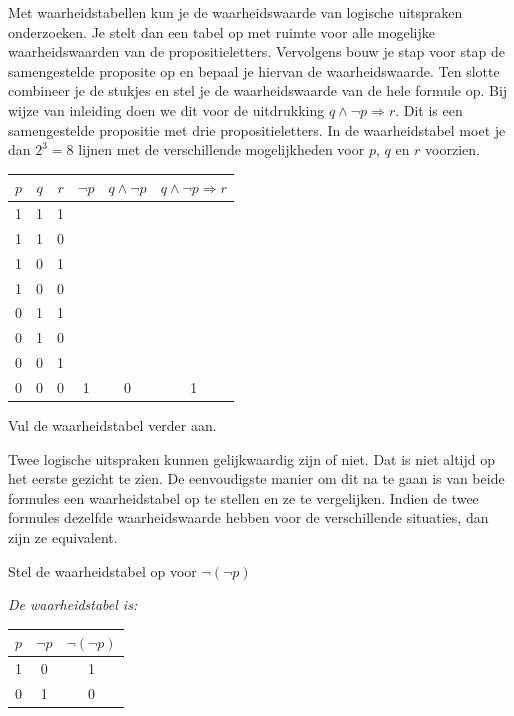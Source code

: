 
Met waarheidstabellen kun je de waarheidswaarde van logische uitspraken onderzoeken. Je stelt dan een tabel op met ruimte voor alle mogelijke waarheidswaarden van de propositieletters. Vervolgens bouw je stap voor stap de samengestelde proposite op en bepaal je hiervan de waarheidswaarde. Ten slotte combineer je de stukjes en stel je de waarheidswaarde van de hele formule op. Bij wijze van inleiding doen we dit voor de uitdrukking $q\land \lnot p \Rightarrow r$. Dit is een samengestelde propositie met drie propositieletters. In de waarheidstabel moet je dan $2^3=8$ lijnen met de verschillende mogelijkheden voor $p$, $q$ en $r$ voorzien.

\begin{center}
\begin{tabular}{c|c|c|c|c|c}  
$p$ & $q$ & $r$ & $\lnot p$ & $q\land \lnot p$ & $q\land \lnot p \Rightarrow r$\\
\hline
1 & 1 & 1 &  &  & \\
1 & 1 & 0 &  &  & \\
1 & 0 & 1 &  &  & \\
1 & 0 & 0 &  &  & \\
0 & 1 & 1 &  &  & \\
0 & 1 & 0 &  &  & \\
0 & 0 & 1 &  &  & \\
0 & 0 & 0 & 1 & 0 & 1
\end{tabular}
\end{center}

\begin{werktekstoef}
\item{Vul de waarheidstabel verder aan.}
\end{werktekstoef}

Twee logische uitspraken kunnen gelijkwaardig zijn of niet. Dat is niet altijd op het eerste gezicht te zien. De eenvoudigste manier om dit na te gaan is van beide formules een waarheidstabel op te stellen en ze te vergelijken. Indien de twee formules dezelfde waarheidswaarde hebben voor de verschillende situaties, dan zijn ze equivalent. 

\begin{werktekstoef}
\setcounter{enumi}{1} 
\item{Stel de waarheidstabel op voor $\lnot (\lnot p)$}

\emph{De waarheidstabel is:}
\end{werktekstoef}
\begin{center}
\begin{tabular}{c|c|c}  
$p$ & $\lnot p$ & $\lnot (\lnot p)$\\
\hline
1 & 0 & 1\\
0 & 1 & 0
\end{tabular}
\end{center}


